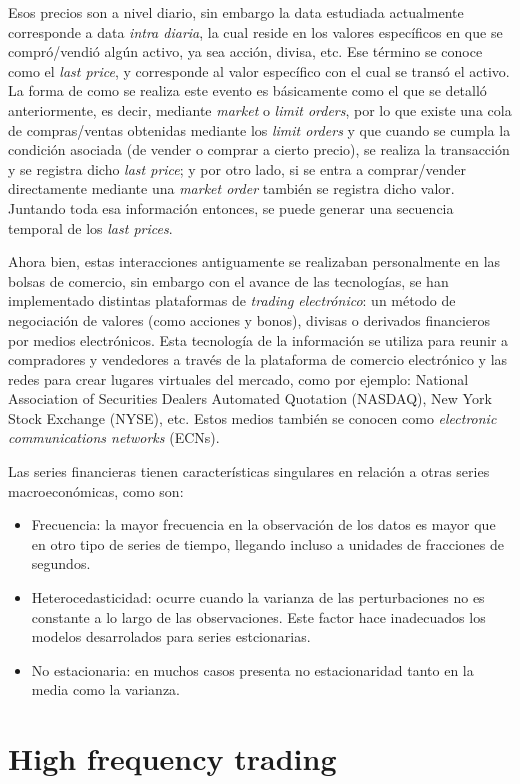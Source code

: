Esos precios son a nivel diario, sin embargo la data estudiada actualmente corresponde a data \emph{intra diaria}, la cual reside en los valores
específicos en que se compró/vendió algún activo, ya sea acción, divisa, etc. Ese término se conoce como el \emph{last price}, y corresponde
al valor específico con el cual se transó el activo. La forma de como se realiza este evento es básicamente como el que se detalló anteriormente,
es decir, mediante \emph{market} o \emph{limit orders}, por lo que existe una cola de compras/ventas obtenidas mediante los \emph{limit orders} y que cuando
se cumpla la condición asociada (de vender o comprar a cierto precio), se realiza la transacción y se registra dicho \emph{last price}; 
y por otro lado, si se entra a comprar/vender directamente mediante una \emph{market order} también se registra dicho valor. 
Juntando toda esa información entonces, se puede generar una secuencia temporal de los \emph{last prices}.

Ahora bien, estas interacciones antiguamente se realizaban personalmente en las bolsas de comercio, sin embargo con el avance de las tecnologías,
se han implementado distintas plataformas de \emph{trading electrónico}: un método de negociación de valores (como acciones y bonos), divisas o derivados 
financieros por medios electrónicos. Esta tecnología de la información se utiliza para reunir a compradores y vendedores a través de la plataforma de 
comercio electrónico y las redes para crear lugares virtuales del mercado, como por ejemplo: National Association of Securities Dealers Automated 
Quotation (NASDAQ), New York Stock Exchange (NYSE), etc. Estos medios también se conocen como \emph{electronic communications networks} (ECNs).


Las series financieras tienen características singulares en relación a otras series macroeconómicas, como son: 
\begin{itemize}
	\item Frecuencia: la mayor frecuencia en la observación de los datos es mayor que en otro tipo de series de tiempo, llegando incluso
		a unidades de fracciones de segundos.
	\item Heterocedasticidad: ocurre cuando la varianza de las perturbaciones no es constante a lo largo de las observaciones.
		Este factor hace inadecuados los modelos desarrolados para series estcionarias.
	\item No estacionaria: en muchos casos presenta no estacionaridad tanto en la media como la varianza.
		
\end{itemize}

\section{High frequency trading}
